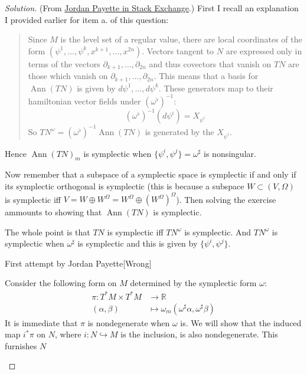 \begin{proof}[Solution]\leavevmode
	(From \href{https://math.stackexchange.com/questions/4974063/level-set-submanifold-is-symplectic-iff-poisson-bracket-matrix-is-nonsingular?noredirect=1#comment10675364_4974063}{Jordan Payette in Stack Exchange}.) \hspace{0.5em} 
	First I recall an explanation I provided earlier for item a. of this question:

\begin{quotation}
		Since $M$ is the level set of a regular value, there are local coordinates of the form $(\psi^1,\ldots,\psi^k,x^{k+1},\ldots,x^{2n})$. Vectors tangent to $N$ are expressed only in terms of the vectors $\partial_{k+1},\ldots,\partial_{2n}$ and thus covectors that vanish on $T N$ are those which vanish on $\partial_{k+1},\ldots, \partial_{2n}$. This means that a basis for $\operatorname{Ann}(T N)$ is given by $d\psi^1,\ldots,d\psi^k$. These generators map to their hamiltonian vector fields under $(\omega^\flat)^{-1}$:
\[\left(\omega^\flat \right)^{-1}(d\psi^i)=X_{\psi^i}\]
So $T N^\omega= (\omega^\flat)^{-1}\operatorname{Ann}(TN)$ is generated by the $X_{\psi^i}$.
\end{quotation}

Hence $\operatorname{Ann}(TN)_m$ is symplectic when $\{\psi^i,\psi^j\}=\omega^\sharp$ is nonsingular.

Now remember that a subspace of a symplectic space is symplectic if and only if its symplectic orthogonal is symplectic (this is because  a subspace  $W\subset(V,\Omega)$ is symplectic iff $V=W\oplus W^\Omega=W^\Omega\oplus (W^\Omega)^\Omega$). Then solving the exercise ammounts to showing that $\operatorname{Ann}(TN)$ is symplectic.

\begin{upshot}\leavevmode
	The whole point is that $TN$ is symplectic iff $TN^\omega$ is symplectic. And $TN^\omega$ is symplectic when $\omega ^\sharp$ is symplectic and this is given by $\{\psi^i,\psi^j\}$.
\end{upshot}


\begin{thing5}{First attempt by Jordan Payette}[Wrong]\leavevmode
	
	Consider the following form on $M$ determined by the symplectic form $\omega$:
	\begin{align*}
		\pi: T^*M\times T^*M  &\longrightarrow \mathbb{R} \\
		(\alpha,\beta) &\longmapsto \omega_m(\omega ^\sharp\alpha,\omega ^\sharp\beta)
	\end{align*}
It is immediate that $\pi$ is nondegenerate when $\omega$ is. We will show that the induced map $i^*\pi$ on $N$, where $i:N\hookrightarrow M$ is the inclusion, is also nondegenerate. This furnishes $N$


\end{thing5}
\end{proof}
